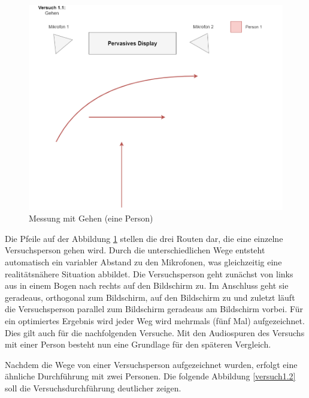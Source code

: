 \begin{figure}[H]
	\begin{center}
		\includegraphics[width=\textwidth]{images/Versuch 1.1.PNG}
		\caption{Messung mit Gehen (eine Person)}
		\label{versuch1.1}
	\end{center}
\end{figure}
 


Die Pfeile auf der Abbildung \ref{versuch1.1} stellen die drei Routen dar, die eine einzelne Versuchsperson gehen wird. Durch die unterschiedlichen Wege entsteht automatisch ein variabler Abstand zu den Mikrofonen, was gleichzeitig eine realitätsnähere Situation abbildet. Die Versuchsperson geht zunächst von links aus in einem Bogen nach rechts auf den Bildschirm zu. Im Anschluss geht sie geradeaus, orthogonal zum Bildschirm, auf den Bildschirm zu und zuletzt läuft die Versuchsperson parallel zum Bildschirm geradeaus am Bildschirm vorbei. Für ein optimiertes Ergebnis wird jeder Weg wird mehrmals (fünf Mal) aufgezeichnet. Dies gilt auch für die nachfolgenden Versuche. Mit den Audiospuren des Versuchs mit einer Person besteht nun eine Grundlage für den späteren Vergleich.

Nachdem die Wege von einer Versuchsperson aufgezeichnet wurden, erfolgt eine ähnliche Durchführung mit zwei Personen. Die folgende Abbildung \ref{versuch1.2} soll die Versuchsdurchführung deutlicher zeigen.

